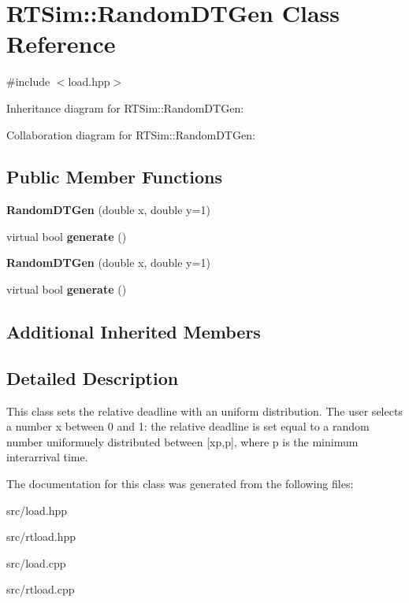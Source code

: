 \hypertarget{classRTSim_1_1RandomDTGen}{}\section{R\+T\+Sim\+:\+:Random\+D\+T\+Gen Class Reference}
\label{classRTSim_1_1RandomDTGen}


{\ttfamily \#include $<$load.\+hpp$>$}



Inheritance diagram for R\+T\+Sim\+:\+:Random\+D\+T\+Gen\+:


Collaboration diagram for R\+T\+Sim\+:\+:Random\+D\+T\+Gen\+:
\subsection*{Public Member Functions}
\begin{DoxyCompactItemize}
\item 
{\bfseries Random\+D\+T\+Gen} (double x, double y=1)\hypertarget{classRTSim_1_1RandomDTGen_a2590247cd14851efae5800029a7a8158}{}\label{classRTSim_1_1RandomDTGen_a2590247cd14851efae5800029a7a8158}

\item 
virtual bool {\bfseries generate} ()\hypertarget{classRTSim_1_1RandomDTGen_a1fdf865f26cae8f6fe3ea1a6a77dbef5}{}\label{classRTSim_1_1RandomDTGen_a1fdf865f26cae8f6fe3ea1a6a77dbef5}

\item 
{\bfseries Random\+D\+T\+Gen} (double x, double y=1)\hypertarget{classRTSim_1_1RandomDTGen_a2590247cd14851efae5800029a7a8158}{}\label{classRTSim_1_1RandomDTGen_a2590247cd14851efae5800029a7a8158}

\item 
virtual bool {\bfseries generate} ()\hypertarget{classRTSim_1_1RandomDTGen_ae0cb14cba64f980ed642d81539940f2a}{}\label{classRTSim_1_1RandomDTGen_ae0cb14cba64f980ed642d81539940f2a}

\end{DoxyCompactItemize}
\subsection*{Additional Inherited Members}


\subsection{Detailed Description}
This class sets the relative deadline with an uniform distribution. The user selects a number x between 0 and 1\+: the relative deadline is set equal to a random number uniformuely distributed between \mbox{[}xp,p\mbox{]}, where p is the minimum interarrival time. 

The documentation for this class was generated from the following files\+:\begin{DoxyCompactItemize}
\item 
src/load.\+hpp\item 
src/rtload.\+hpp\item 
src/load.\+cpp\item 
src/rtload.\+cpp\end{DoxyCompactItemize}
